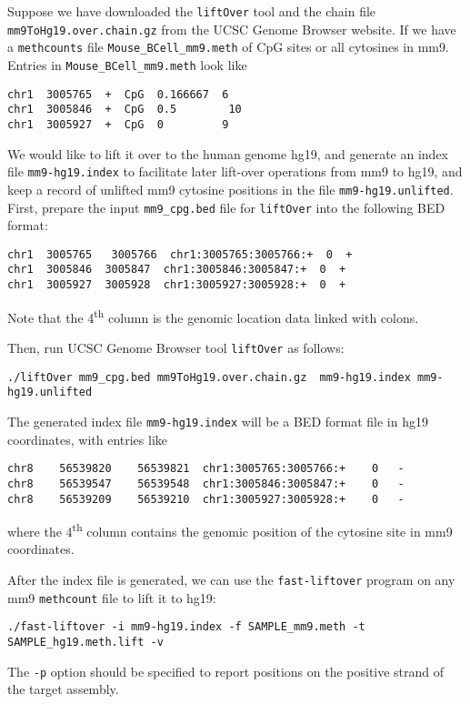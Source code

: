 \documentclass[10pt]{article}
\newcommand{\prog}[1]{\texttt{#1}}
\newcommand{\fn}[1]{\texttt{#1}}
\newcommand{\op}[1]{\texttt{#1}}
\begin{document}
{{Suppose we have downloaded the \prog{liftOver} tool and the chain file
\fn{mm9ToHg19.over.chain.gz} from the UCSC Genome Browser website.  If
we have a \prog{methcounts} file \fn{Mouse\_BCell\_mm9.meth}
of CpG sites or all cytosines in mm9. Entries in
\fn{Mouse\_BCell\_mm9.meth} look like
\begin{verbatim}
chr1  3005765  +  CpG  0.166667  6
chr1  3005846  +  CpG  0.5        10
chr1  3005927  +  CpG  0         9
\end{verbatim}

We would like to lift it over to the human genome hg19, and generate
an index file \fn{mm9-hg19.index} to facilitate later lift-over
operations from mm9 to hg19, and keep a record of unlifted mm9
cytosine positions in the file \fn{mm9-hg19.unlifted}. 
First, prepare the input \fn{mm9\_cpg.bed} file for \prog{liftOver} into 
the following BED format: 
\begin{verbatim}
chr1  3005765 	3005766  chr1:3005765:3005766:+  0  +
chr1  3005846  3005847  chr1:3005846:3005847:+  0  +
chr1  3005927  3005928  chr1:3005927:3005928:+  0  +
\end{verbatim}
Note that the 4\textsuperscript{th} column is the genomic location data linked with colons. 

Then, run UCSC Genome Browser tool \fn{liftOver} as follows:
\begin{verbatim}
./liftOver mm9_cpg.bed mm9ToHg19.over.chain.gz  mm9-hg19.index mm9-hg19.unlifted
\end{verbatim}

The generated index file \fn{mm9-hg19.index} will be a BED format
file in hg19 coordinates, with entries like
\begin{verbatim}
chr8	56539820	56539821  chr1:3005765:3005766:+	0	-
chr8	56539547	56539548  chr1:3005846:3005847:+	0	-
chr8	56539209	56539210  chr1:3005927:3005928:+	0	-
\end{verbatim}
where the 4\textsuperscript{th} column contains the genomic position of the cytosine
site in mm9 coordinates.

After the index file is generated, we can use the \prog{fast-liftover} 
program on any mm9 \prog{methcount} file to lift it to hg19: 
\begin{verbatim}
./fast-liftover -i mm9-hg19.index -f SAMPLE_mm9.meth -t SAMPLE_hg19.meth.lift -v
\end{verbatim}
The \op{-p} option should be specified to report positions on the positive 
strand of the target assembly.  

}}
\end{document}

